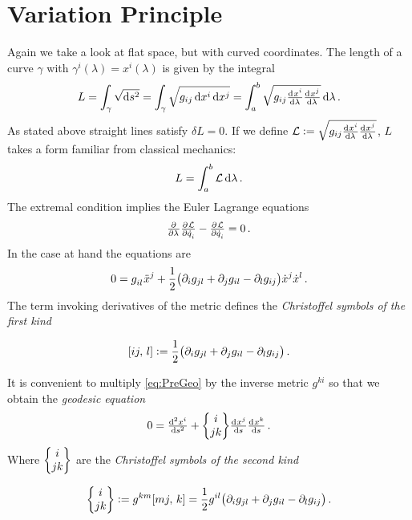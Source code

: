 \section{Variation Principle}
Again we take a look at flat space, but with curved coordinates. 
The length of a curve $\gamma$ with $\gamma^i(\lambda) = x^i(\lambda)$ is given by the integral
\begin{equation}
    L=\int_{\gamma}\sqrt{\dif s^2} = 
    \int_{\gamma}\sqrt{g_{ij}\dif x^i\dif x^j}=\int_{a}^{b}\sqrt{g_{ij}\od{x^i}{\lambda} \od{x^j}{\lambda}}\dif \lambda\, .
\end{equation}
As stated above straight lines satisfy $\delta L = 0$. 
If we define $\mathcal{L}:=\sqrt{g_{ij}\od{x^i}{\lambda} \od{x^j}{\lambda}}$, $L$ takes a form familiar from classical mechanics:
\begin{equation}
    L=\int_a^b \mathcal{L}\dif \lambda\, .
\end{equation}
The extremal condition implies the Euler Lagrange equations
\begin{equation}
    \pd{}{\lambda}\pd{\mathcal{L}}{\dot{q}_i}-\pd{\mathcal{L}}{\dot{q}_i}
=0\, .		\end{equation}
In the case at hand the equations are
\begin{equation}
    0=\tensor{g}{_i_l}\tensor{\ddot{x}}{^j}+\frac{1}{2} \left(\partial_i g_{jl} + \partial_j g_{il} - 
    \partial_l g_{ij}\right)\dot{x}^j\dot{x}^l\, . \label{eq:PreGeo}
\end{equation}
The term invoking derivatives of the metric defines the \emph{Christoffel symbols of the first kind}
\begin{definition}
\begin{equation}
    \csym{i}{j}{l}:=\frac{1}{2} \left(\partial_i g_{jl} + \partial_j g_{il} -
    \partial_l g_{ij}\right)\, .
\end{equation}
\end{definition}
It is convenient to multiply \eqref{eq:PreGeo} by the inverse metric $g^{ki}$ so that we obtain the \emph{geodesic equation}
\begin{equation}
    0 =
    \od[2]{x^i}{s}+\cSym{i}{j}{k}\od{x^j}{s}\od{x^k}{s}\, .
\end{equation}
Where $\begin{Bmatrix} i \\ j k \end{Bmatrix}$ are the \emph{Christoffel symbols of the second kind}
\begin{definition}
\begin{equation}
   \cSym{i}{j}{k}:=g^{km}\csym{m}{j}{k}=\frac{1}{2}g^{il}\left(\partial_i
    g_{jl} + \partial_j g_{il} - \partial_l g_{ij}\right)\, .
\end{equation}
\end{definition}
